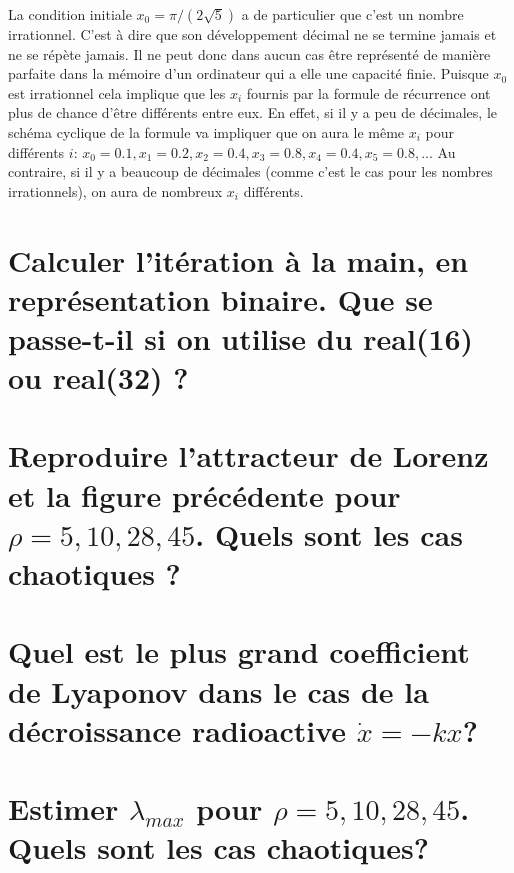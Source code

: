 \documentclass[a4paper, 12pt]{report}
\begin{document}
La condition initiale $x_0 = \pi/(2 \sqrt{5})$ a de particulier que
c'est un nombre irrationnel. C'est à dire que son développement décimal ne
se termine jamais et ne se répète jamais. Il ne peut donc dans aucun cas
être représenté de manière parfaite dans la mémoire d'un ordinateur qui a elle
une capacité finie. Puisque $x_0$ est irrationnel cela implique que les $x_i$
fournis par la formule de récurrence ont plus de chance d'être différents entre
eux. En effet, si il y a peu de décimales, le schéma cyclique de la formule
va impliquer que on aura le même $x_i$ pour différents $i$: $x_0=0.1, x_1 = 0.2,x_2 = 0.4,x_3 = 0.8, x_4=0.4, x_5=0.8,...$
Au contraire, si il y a beaucoup de décimales (comme c'est le cas pour
les nombres irrationnels), on aura de nombreux $x_i$ différents.

\section{Calculer l'itération à la main, en représentation binaire.
Que se passe-t-il si on utilise du real(16) ou real(32) ?}

\section{Reproduire l'attracteur de Lorenz et la figure précédente pour
$\rho = 5, 10, 28, 45$. Quels sont les cas chaotiques ?}

\section{Quel est le plus grand coefficient de Lyaponov dans le cas de la
décroissance radioactive $\dot{x} = -kx$?}

\section{Estimer $\lambda_{max}$ pour $\rho=5,10,28,45$. Quels sont les cas
chaotiques?}

\end{document}
